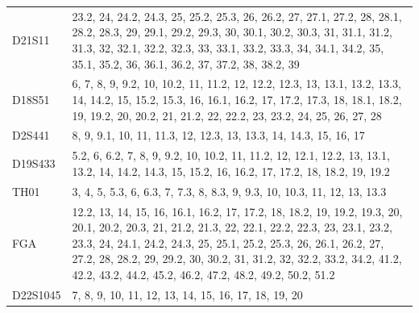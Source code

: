 \begin{theappendices}
\begin{table}[htbp]
\begin{tabularx}{\textwidth}{lX}
  D21S11 &                                                                                   23.2, 24, 24.2, 24.3, 25, 25.2, 25.3, 26, 26.2, 27, 27.1, 27.2, 28, 28.1, 28.2, 28.3, 29, 29.1, 29.2, 29.3, 30, 30.1, 30.2, 30.3, 31, 31.1, 31.2, 31.3, 32, 32.1, 32.2, 32.3, 33, 33.1, 33.2, 33.3, 34, 34.1, 34.2, 35, 35.1, 35.2, 36, 36.1, 36.2, 37, 37.2, 38, 38.2, 39 \\
  D18S51 &                                                                                                                                    6, 7, 8, 9, 9.2, 10, 10.2, 11, 11.2, 12, 12.2, 12.3, 13, 13.1, 13.2, 13.3, 14, 14.2, 15, 15.2, 15.3, 16, 16.1, 16.2, 17, 17.2, 17.3, 18, 18.1, 18.2, 19, 19.2, 20, 20.2, 21, 21.2, 22, 22.2, 23, 23.2, 24, 25, 26, 27, 28 \\
  D2S441 &                                                                                                                                                                                                                                                                                            8, 9, 9.1, 10, 11, 11.3, 12, 12.3, 13, 13.3, 14, 14.3, 15, 16, 17 \\
 D19S433 &                                                                                                                                                                                                              5.2, 6, 6.2, 7, 8, 9, 9.2, 10, 10.2, 11, 11.2, 12, 12.1, 12.2, 13, 13.1, 13.2, 14, 14.2, 14.3, 15, 15.2, 16, 16.2, 17, 17.2, 18, 18.2, 19, 19.2 \\
    TH01 &                                                                                                                                                                                                                                                                                     3, 4, 5, 5.3, 6, 6.3, 7, 7.3, 8, 8.3, 9, 9.3, 10, 10.3, 11, 12, 13, 13.3 \\
     FGA & 12.2, 13, 14, 15, 16, 16.1, 16.2, 17, 17.2, 18, 18.2, 19, 19.2, 19.3, 20, 20.1, 20.2, 20.3, 21, 21.2, 21.3, 22, 22.1, 22.2, 22.3, 23, 23.1, 23.2, 23.3, 24, 24.1, 24.2, 24.3, 25, 25.1, 25.2, 25.3, 26, 26.1, 26.2, 27, 27.2, 28, 28.2, 29, 29.2, 30, 30.2, 31, 31.2, 32, 32.2, 33.2, 34.2, 41.2, 42.2, 43.2, 44.2, 45.2, 46.2, 47.2, 48.2, 49.2, 50.2, 51.2 \\
D22S1045 &                                                                                                                                                                                                                                                                                                          7, 8, 9, 10, 11, 12, 13, 14, 15, 16, 17, 18, 19, 20 \\

\end{tabularx}
\end{table}
\end{theappendices}
